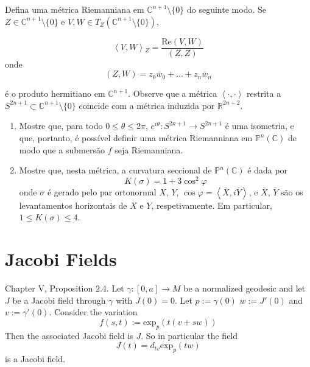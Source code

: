 \begin{example}
\label{example-curvature-of-CPn}
Defina uma métrica Riemanniana  em
$\mathbb{C}^{n+1}\setminus\{0\}$ do
seguinte modo. Se $Z \in
\mathbb{C}^{n+1}\setminus\{0\}$ e $V,W \in
T_Z
(\mathbb{C}^{n+1}\setminus\{0\})$,

$$
\left\langle{}V,W\right\rangle{}_Z=\frac{\text{Re}(V,W)}{(Z,
Z)}
$$
onde
$$
(Z,W)=z_0\overline{w}_0+\ldots+
z_n\overline{w}_n
$$

é o produto hermitiano em $\mathbb{C}^{n+1}$.
Observe que a métrica
$\left\langle{}\cdot,\cdot\right\rangle{}$ restrita a
$S^{2n+1}\subset
\mathbb{C}^{n+1}\setminus\{0\}$ coincide com
a métrica induzida por
$\mathbb{R}^{2n+2}$.
\begin{enumerate}

\item Mostre que, para todo $0\leq \theta
\leq 2\pi$, $e^{i\theta}:S^{2n+1}\to
S^{2n+1}$ é uma isometria, e que, portanto, é
possível definir uma métrica
Riemanniana em $\mathbb{P}^n(\mathbb{C})$ de
modo que a submersão $f$ seja
Riemanniana.

\item Mostre que, nesta métrica, a curvatura
seccional de
$\mathbb{P}^n(\mathbb{C})$ é dada por
$$
K(\sigma)=1+3\cos^2\varphi
$$
onde $\sigma$ é gerado pelo par ortonormal
$X$, $Y$, $\cos
\varphi=\left\langle{}\overline{X},i\overline{Y}
\right\rangle{}$,
e $\overline{X}$,
$\overline{Y}$ são os levantamentos
horizontais de $X$ e $Y$, respetivamente. Em
particular, $1 \leq  K(\sigma) \leq  4$.
\end{enumerate}
\end{example}

\section{Jacobi Fields}
\label{section-jacobi-fields}

\begin{proposition}
\label{proposition-everyday-jacobi-field}
\cite{doc} Chapter V, Proposition 2.4. Let
$\gamma:[0,a]\to M$ be a normalized
geodesic and let $J$ be a Jacobi field
through $\gamma$ with $J(0)=0$.
Let $p:=\gamma(0)$ $w:=J'(0)$ and
$v:=\gamma'(0)$.
Consider the variation
$$
f(s,t):=\text{exp}_{p}(t(v+sw))
$$
Then the associated Jacobi field is $J$. So
in particular the field
$$
J(t)=d_{tv}\text{exp}_p(tw)
$$
is a Jacobi field.

\end{proposition}

